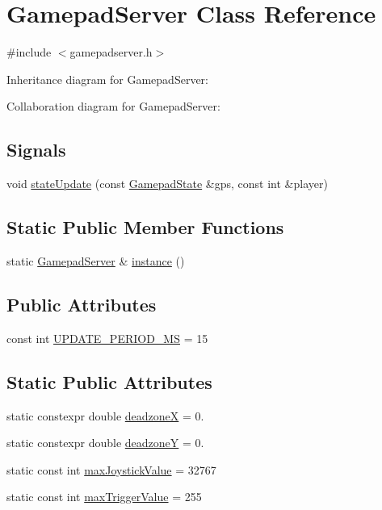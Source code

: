 \hypertarget{class_gamepad_server}{}\section{Gamepad\+Server Class Reference}
\label{class_gamepad_server}


{\ttfamily \#include $<$gamepadserver.\+h$>$}



Inheritance diagram for Gamepad\+Server\+:


Collaboration diagram for Gamepad\+Server\+:
\subsection*{Signals}
\begin{DoxyCompactItemize}
\item 
void \mbox{\hyperlink{class_gamepad_server_a1f7b4b9ded7aa0d6982543e97cf05da0}{state\+Update}} (const \mbox{\hyperlink{class_gamepad_state}{Gamepad\+State}} \&gps, const int \&player)
\end{DoxyCompactItemize}
\subsection*{Static Public Member Functions}
\begin{DoxyCompactItemize}
\item 
static \mbox{\hyperlink{class_gamepad_server}{Gamepad\+Server}} \& \mbox{\hyperlink{class_gamepad_server_a18cc731027dd5f2b4a1879e1a8d37323}{instance}} ()
\end{DoxyCompactItemize}
\subsection*{Public Attributes}
\begin{DoxyCompactItemize}
\item 
const int \mbox{\hyperlink{class_gamepad_server_afedf5e5e6725878a37509c496f1c8a16}{U\+P\+D\+A\+T\+E\+\_\+\+P\+E\+R\+I\+O\+D\+\_\+\+MS}} = 15
\end{DoxyCompactItemize}
\subsection*{Static Public Attributes}
\begin{DoxyCompactItemize}
\item 
static constexpr double \mbox{\hyperlink{class_gamepad_server_a11ce0f01e1d7bc8dcb8759f3d76d082b}{deadzoneX}} = 0.
\item 
static constexpr double \mbox{\hyperlink{class_gamepad_server_ae1ed960ab8a24c5dc0f1679a7f93e65c}{deadzoneY}} = 0.
\item 
static const int \mbox{\hyperlink{class_gamepad_server_a3bd710d06a8dfae1be029e3abacab2d2}{max\+Joystick\+Value}} = 32767
\item 
static const int \mbox{\hyperlink{class_gamepad_server_a55b784c3b441918f845d17630f1a6a1c}{max\+Trigger\+Value}} = 255
\end{DoxyCompactItemize}
